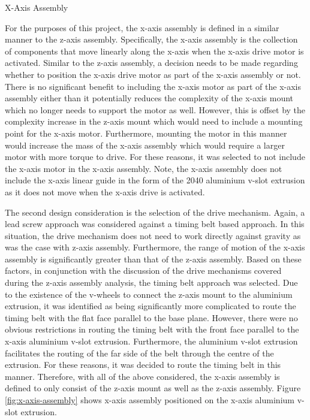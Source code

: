 X-Axis Assembly

For the purposes of this project, the x-axis assembly is defined in a similar manner to the z-axis assembly. Specifically, the x-axis assembly is the collection of components that move linearly along the x-axis when the x-axis drive motor is activated. Similar to the z-axis assembly, a decision needs to be made regarding whether to position the x-axis drive motor as part of the x-axis assembly or not. There is no significant benefit to including the x-axis motor as part of the x-axis assembly either than it potentially reduces the complexity of the x-axis mount which no longer needs to support the motor as well. However, this is offset by the complexity increase in the z-axis mount which would need to include a mounting point for the x-axis motor. Furthermore, mounting the motor in this manner would increase the mass of the x-axis assembly which would require a larger motor with more torque to drive. For these reasons, it was selected to not include the x-axis motor in the x-axis assembly. Note, the x-axis assembly does not include the x-axis linear guide in the form of the 2040 aluminium v-slot extrusion as it does not move when the x-axis drive is activated.

The second design consideration is the selection of the drive mechanism. Again, a lead screw approach was considered against a timing belt based approach. In this situation, the drive mechanism does not need to work directly against gravity as was the case with z-axis assembly. Furthermore, the range of motion of the x-axis assembly is significantly greater than that of the z-axis assembly. Based on these factors, in conjunction with the discussion of the drive mechanisms covered during the z-axis assembly analysis, the timing belt approach was selected. Due to the existence of the v-wheels to connect the z-axis mount to the aluminium extrusion, it was identified as being significantly more complicated to route the timing belt with the flat face parallel to the base plane. However, there were no obvious restrictions in routing the timing belt with the front face parallel to the x-axis aluminium v-slot extrusion. Furthermore, the aluminium v-slot extrusion facilitates the routing of the far side of the belt through the centre of the extrusion. For these reasons, it was decided to route the timing belt in this manner. Therefore, with all of the above considered, the x-axis assembly is defined to only consist of the z-axis mount as well as the z-axis assembly. Figure \ref{fig:x-axis-assembly} shows x-axis assembly positioned on the x-axis aluminium v-slot extrusion.

